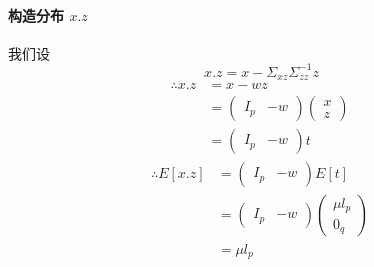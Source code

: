 \documentclass{report}
\begin{document}
\paragraph{构造分布 $x.z$\\}
我们设
$$\ x.z = x - \Sigma_{xz} \Sigma_{zz}^{-1}z$$
\begin{equation}
\begin{aligned}
\therefore x.z &= x - wz\\
&=
\left (
\begin{matrix}
I_p & -w
\end{matrix}
\right )
\left (
\begin{matrix}
x \\
z
\end{matrix}
\right )\\
&=\left (
\begin{matrix}
I_p & -w
\end{matrix}
\right )
t
\end{aligned}
\end{equation}
\begin{equation}
\begin{aligned}
\therefore 
E[x.z]&=
\left (
\begin{matrix}
I_p & -w
\end{matrix}
\right ) E[t]\\
&= 
\left (
\begin{matrix}
I_p & -w
\end{matrix}
\right )
\left (
\begin{matrix}
\mu l_p\\
0_q
\end{matrix}
\right )\\
&=\mu l_p
\end{aligned}
\end{equation}
\end{document}
